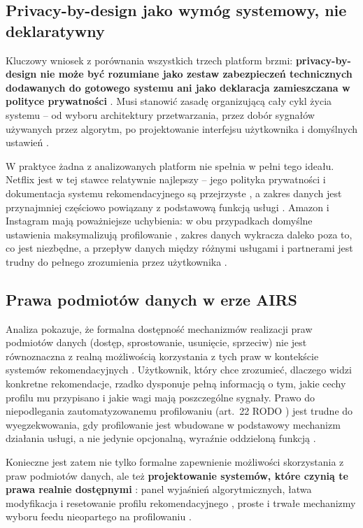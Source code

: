 \documentclass[12pt, a4paper]{article}
\begin{document}
\subsection{Privacy-by-design jako wymóg systemowy, nie deklaratywny}

Kluczowy wniosek z porównania wszystkich trzech platform brzmi: \textbf{privacy-by-design nie może być rozumiane jako zestaw zabezpieczeń technicznych dodawanych do gotowego systemu ani jako deklaracja zamieszczana w polityce prywatności} \cite{edpb2019}. Musi stanowić zasadę organizującą cały cykl życia systemu -- od wyboru architektury przetwarzania, przez dobór sygnałów używanych przez algorytm, po projektowanie interfejsu użytkownika i domyślnych ustawień \cite{edpb2019, rodo}.

W praktyce żadna z analizowanych platform nie spełnia w pełni tego ideału. Netflix jest w tej stawce relatywnie najlepszy -- jego polityka prywatności i dokumentacja systemu rekomendacyjnego są przejrzyste \cite{netflix_privacy, netflix_recs}, a zakres danych jest przynajmniej częściowo powiązany z podstawową funkcją usługi \cite{netflix_data}. Amazon i Instagram mają poważniejsze uchybienia: w obu przypadkach domyślne ustawienia maksymalizują profilowanie \cite{amazon_privacy, meta_privacy}, zakres danych wykracza daleko poza to, co jest niezbędne, a przepływ danych między różnymi usługami i partnerami jest trudny do pełnego zrozumienia przez użytkownika \cite{chen2025}.

\subsection{Prawa podmiotów danych w erze AIRS}

Analiza pokazuje, że formalna dostępność mechanizmów realizacji praw podmiotów danych (dostęp, sprostowanie, usunięcie, sprzeciw) nie jest równoznaczna z realną możliwością korzystania z tych praw w kontekście systemów rekomendacyjnych \cite{chen2025, edpb2019}. Użytkownik, który chce zrozumieć, dlaczego widzi konkretne rekomendacje, rzadko dysponuje pełną informacją o tym, jakie cechy profilu mu przypisano i jakie wagi mają poszczególne sygnały. Prawo do niepodlegania zautomatyzowanemu profilowaniu (art.~22 RODO \cite{rodo}) jest trudne do wyegzekwowania, gdy profilowanie jest wbudowane w podstawowy mechanizm działania usługi, a nie jedynie opcjonalną, wyraźnie oddzieloną funkcją \cite{netflix_recs, ig_ranking, amazon_privacy}.

Konieczne jest zatem nie tylko formalne zapewnienie możliwości skorzystania z praw podmiotów danych, ale też \textbf{projektowanie systemów, które czynią te prawa realnie dostępnymi} \cite{edpb2019}: panel wyjaśnień algorytmicznych, łatwa modyfikacja i resetowanie profilu rekomendacyjnego \cite{ig_reset, netflix_stop}, proste i trwałe mechanizmy wyboru feedu nieopartego na profilowaniu \cite{dsa}.
\end{document}
